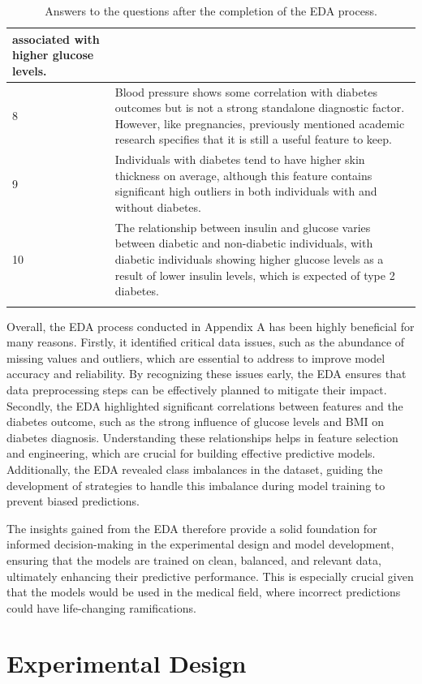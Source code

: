 \documentclass[12pt]{report}
\newcommand{\para}{\vspace{8pt}\noindent}
\begin{document}
\begin{longtable}{ | p{} | p{} | }
    associated with higher glucose levels.\\
    \hline
    8 & Blood pressure shows some correlation with diabetes outcomes but is not a strong standalone diagnostic factor. 
    However, like pregnancies, previously mentioned academic research specifies that it is still a useful feature to keep.\\
    \hline
    9 & Individuals with diabetes tend to have higher skin thickness on average, although this feature contains significant high outliers
    in both individuals with and without diabetes.\\
    \hline
    10 &  The relationship between insulin and glucose varies between diabetic and non-diabetic individuals, with diabetic individuals 
    showing higher glucose levels as a result of lower insulin levels, which is expected of type 2 diabetes.\\
    \hline
    \caption{Answers to the questions after the completion of the EDA process.}\label{tab:Answers}
\end{longtable}

\pagebreak
\para Overall, the EDA process conducted in Appendix A has been highly beneficial for many reasons. Firstly, it identified critical data issues, 
such as the abundance of missing values and outliers, which are essential to address to improve model accuracy and reliability. By recognizing these 
issues early, the EDA ensures that data preprocessing steps can be effectively planned to mitigate their impact. Secondly, the EDA highlighted significant
correlations between features and the diabetes outcome, such as the strong influence of glucose levels and BMI on diabetes diagnosis. Understanding these
relationships helps in feature selection and engineering, which are crucial for building effective predictive models. Additionally, the EDA revealed class 
imbalances in the dataset, guiding the development of strategies to handle this imbalance during model training to prevent biased predictions. 

\para The insights gained from the EDA therefore provide a solid foundation for informed decision-making in the experimental design and model development, 
ensuring that the models are trained on clean, balanced, and relevant data, ultimately enhancing their predictive performance. This is especially crucial 
given that the models would be used in the medical field, where incorrect predictions could have life-changing ramifications.

\chapter{Experimental Design} %
\end{document}
